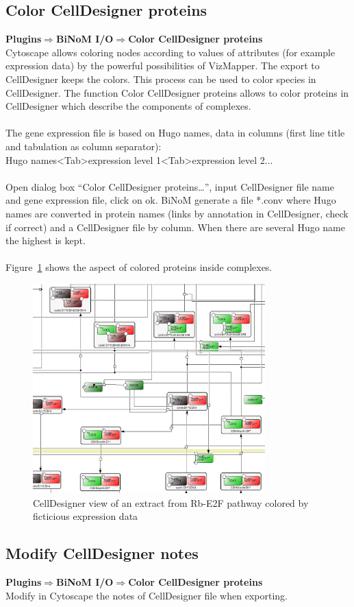 \subsection{Color CellDesigner proteins}
\textbf{Plugins$\Rightarrow$BiNoM I/O$\Rightarrow$Color CellDesigner proteins}\\
Cytoscape allows coloring nodes according to values of attributes (for example expression data) by the powerful possibilities of VizMapper. The export to CellDesigner keeps the colors. This process can be used to color species in CellDesigner. The function Color CellDesigner proteins allows to color proteins in CellDesigner which describe the components of complexes.\\\\
The gene expression file is based on Hugo names, data in columns (first line title and tabulation as column separator):\\Hugo names\textless Tab\textgreater expression level 1\textless Tab\textgreater expression level 2$\ldots$\\\\
Open dialog box “Color CellDesigner proteins…”, input CellDesigner file name and gene expression file, click on ok. BiNoM generate a file *.conv where Hugo names are converted in protein names (links by annotation in CellDesigner, check if correct) and a CellDesigner file by column. When there are several Hugo name the highest is kept.\\\\
Figure~\ref{Colored_CellDesigner_view_by_ficticious_data} shows the aspect of colored proteins inside complexes.
\begin{figure}
\centering
\includegraphics[width=0.8\textwidth]{graphics/Colored_CellDesigner_view_by_ficticious_data}
\caption{CellDesigner view of an extract from Rb-E2F\cite{calzone2008comprehensive} pathway colored by ficticious expression data}
\label{Colored_CellDesigner_view_by_ficticious_data}
\end{figure}

\subsection{Modify CellDesigner notes}
\textbf{Plugins$\Rightarrow$BiNoM I/O$\Rightarrow$Color CellDesigner proteins}\\
Modify in Cytoscape the notes of CellDesigner file when exporting.
